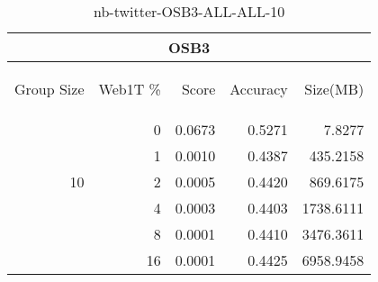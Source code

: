 \begin{center}
\begin{table}[htbp] 
 \begin{center}
\begin{tabular}{ | r | r | r | r | r |}
\hline
\multicolumn{5}{|c|}{OSB3}\\
\hline
\begin{sideways}Group Size\end{sideways} & \begin{sideways}Web1T \%\end{sideways} & \begin{sideways}Score\end{sideways} & \begin{sideways}Accuracy\end{sideways} & \begin{sideways}Size(MB)\end{sideways}\\
\hline
\multirow{5}{*}{10}
 & 0 & 0.0673 & 0.5271 & 7.8277\\ \cline{2-5}
 & 1 & 0.0010 & 0.4387 & 435.2158\\ \cline{2-5}
 & 2 & 0.0005 & 0.4420 & 869.6175\\ \cline{2-5}
 & 4 & 0.0003 & 0.4403 & 1738.6111\\ \cline{2-5}
 & 8 & 0.0001 & 0.4410 & 3476.3611\\ \cline{2-5}
 & 16 & 0.0001 & 0.4425 & 6958.9458\\ \cline{2-5}
\hline
\end{tabular}
\caption{nb-twitter-OSB3-ALL-ALL-10}
\label{table:nb-twitter-OSB3-ALL-ALL-10}
\end{center}
 \end{table}
\end{center}

